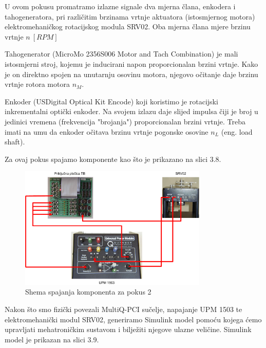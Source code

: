 \documentclass[12pt,a4paper]{article}
\begin{document}
U ovom pokusu promatramo izlazne signale dva mjerna člana, enkodera i tahogeneratora, pri različitim brzinama vrtnje aktuatora (istosmjernog motora) elektromehaničkog rotacijskog modula SRV02. Oba mjerna člana mjere brzinu vrtnje $n\ [RPM]$

Tahogenerator (MicroMo 2356S006 Motor and Tach Combination) je mali istosmjerni stroj, kojemu je inducirani napon proporcionalan brzini vrtnje. Kako je on direktno spojen na unutarnju osovinu motora, njegovo očitanje daje brzinu vrtnje rotora motora $n_M$.

Enkoder (USDigital Optical Kit Encode) koji koristimo je rotacijski inkrementalni optički enkoder. Na svojem izlazu daje slijed impulsa čiji je broj u jedinici vremena (frekvencija "brojanja") proporcionalan brzini vrtnje. Treba imati na umu da enkoder očitava brzinu vrtnje pogonske osovine $n_L$ (eng. load shaft).\newline

Za ovaj pokus spajamo komponente kao što je prikazano na slici 3.8.
\newpage

\begin{figure}[ht]
	\begin{center}
	\includegraphics[width=0.8\textwidth] {spoj2.png}
    \caption{Shema spajanja komponenta za pokus 2}
    \end{center}
\end{figure}

Nakon što smo fizički povezali MultiQ-PCI sučelje, napajanje UPM 1503 te elektromehanički modul SRV02, generiramo Simulink model pomoću kojega ćemo upravljati mehatroničkim sustavom i bilježiti njegove ulazne veličine. Simulink model je prikazan na slici 3.9.
\end{document}
